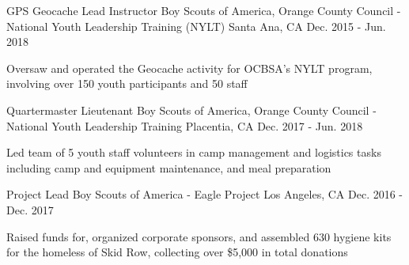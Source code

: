 
  \cventry
    {GPS Geocache Lead Instructor} %
    {Boy Scouts of America, Orange County Council - National Youth Leadership Training (NYLT)} %
    {Santa Ana, CA} %
    {Dec. 2015 - Jun. 2018} %
    {
      \begin{cvitems} %
        \item {Oversaw and operated the Geocache activity for OCBSA’s NYLT program, involving over 150 youth participants and 50 staff}
      \end{cvitems}
    }

  \cventry
    {Quartermaster Lieutenant} %
    {Boy Scouts of America, Orange County Council - National Youth Leadership Training} %
    {Placentia, CA} %
    {Dec. 2017 - Jun. 2018} %
    {
      \begin{cvitems} %
        \item {Led team of 5 youth staff volunteers in camp management and logistics tasks including camp and equipment maintenance, and meal preparation}
      \end{cvitems}
    }

  \cventry
    {Project Lead} %
    {Boy Scouts of America - Eagle Project} %
    {Los Angeles, CA} %
    {Dec. 2016 - Dec. 2017} %
    {
      \begin{cvitems} %
        \item {Raised funds for, organized corporate sponsors, and assembled 630 hygiene kits for the homeless of Skid Row, collecting over \$5,000 in total donations}
      \end{cvitems}
    }